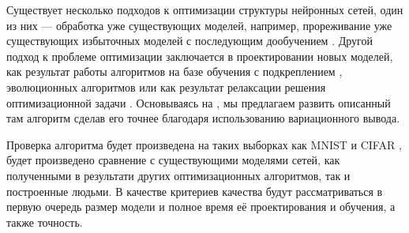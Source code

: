 \documentclass[12pt, twoside]{article}
\begin{document}
Существует несколько подходов к оптимизации структуры нейронных сетей, один из них --- обработка уже существующих моделей, например, прореживание уже существующих избыточных моделей с последующим дообучением \cite{learn_both} \cite{chan_prun} \cite{lottery_ticket}. Другой подход к проблеме оптимизации заключается в проектировании новых моделей, как результат работы алгоритмов на базе обучения с подкреплением \cite{nas}, эволюционных алгоритмов \cite{evol} или как результат релаксации решения оптимизационной задачи \cite{darts}. Основываясь на \cite{darts}, мы предлагаем развить описанный там алгоритм сделав его точнее благодаря использованию вариационного вывода.

Проверка алгоритма будет произведена на таких выборках как MNIST \cite{mnist} и CIFAR \cite{cifar}, будет произведено сравнение с существующими моделями сетей, как полученными в результати других оптимизационных алгоритмов, так и построенные людьми. В качестве критериев качества будут рассматриваться в первую очередь размер модели и полное время её проектирования и обучения, а также точность.




\end{document}
